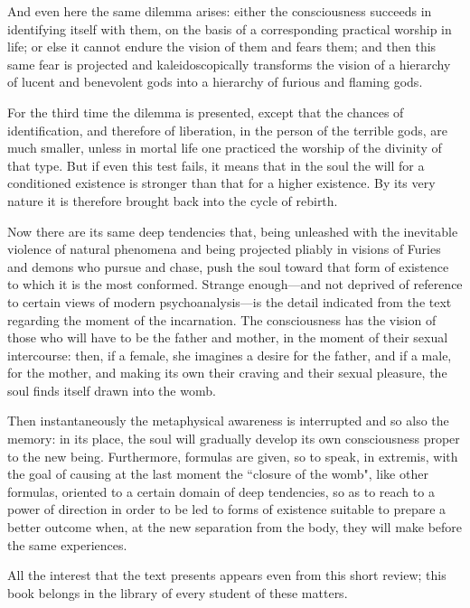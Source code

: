 And even here the same dilemma arises: either the consciousness succeeds in identifying itself with them, on the basis of a corresponding practical worship in life; or else it cannot endure the vision of them and fears them; and then this same fear is projected and kaleidoscopically transforms the vision of a hierarchy of lucent and benevolent gods into a hierarchy of furious and flaming gods.

For the third time the dilemma is presented, except that the chances of identification, and therefore of liberation, in the person of the terrible gods, are much smaller, unless in mortal life one practiced the worship of the divinity of that type. But if even this test fails, it means that in the soul the will for a conditioned existence is stronger than that for a higher existence. By its very nature it is therefore brought back into the cycle of rebirth.

Now there are its same deep tendencies that, being unleashed with the inevitable violence of natural phenomena and being projected pliably in visions of Furies and demons who pursue and chase, push the soul toward that form of existence to which it is the most conformed. Strange enough—and not deprived of reference to certain views of modern psychoanalysis—is the detail indicated from the text regarding the moment of the incarnation. The consciousness has the vision of those who will have to be the father and mother, in the moment of their sexual intercourse: then, if a female, she imagines a desire for the father, and if a male, for the mother, and making its own their craving and their sexual pleasure, the soul finds itself drawn into the womb.

Then instantaneously the metaphysical awareness is interrupted and so also the memory: in its place, the soul will gradually develop its own consciousness proper to the new being. Furthermore, formulas are given, so to speak, in extremis, with the goal of causing at the last moment the ``closure of the womb", like other formulas, oriented to a certain domain of deep tendencies, so as to reach to a power of direction in order to be led to forms of existence suitable to prepare a better outcome when, at the new separation from the body, they will make before the same experiences.

All the interest that the text presents appears even from this short review; this book belongs in the library of every student of these matters.




